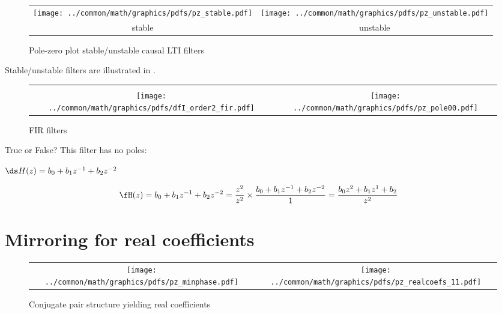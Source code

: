 \begin{figure}[ht]
  \centering%
  \begin{tabular}{|c|c|}
     \hline
     \texttt{[image: ../common/math/graphics/pdfs/pz\_stable.pdf]}
    &\texttt{[image: ../common/math/graphics/pdfs/pz\_unstable.pdf]}
    \\stable & unstable
    \\\hline
\end{tabular}
  \caption{
     Pole-zero plot stable/unstable causal LTI filters 
     \label{fig:pz_unstable}
     }
\end{figure}
\begin{example}
\label{ex:pz_unstable}
Stable/unstable filters are illustrated in .
\end{example}

\begin{figure}
  \centering
  \begin{tabular}{|c|c|}
      \hline
    \\\texttt{[image: ../common/math/graphics/pdfs/dfI\_order2\_fir.pdf]}
     &\texttt{[image: ../common/math/graphics/pdfs/pz\_pole00.pdf]}
    \\\hline
  \end{tabular}
  \caption{FIR filters \label{fig:fir}}
\end{figure}
True or False? This filter has no poles:

  $\ds H(z)= b_0 + b_1 z^{-1} + b_2 z^{-2}$


\begin{align*}
  \fH(z)
    &= b_0 + b_1 z^{-1} + b_2 z^{-2}
     = \frac{z^2}{z^2} \times \frac{b_0 + b_1 z^{-1} + b_2 z^{-2}}{1}
     = \frac{b_0 z^2 + b_1 z^{1} + b_2 }{z^2}
\end{align*}


\section{Mirroring for real coefficients}
\begin{figure}
  \centering
  \begin{tabular}{cc}
    \texttt{[image: ../common/math/graphics/pdfs/pz\_minphase.pdf]}
   &\texttt{[image: ../common/math/graphics/pdfs/pz\_realcoefs\_11.pdf]}
  \end{tabular}
\caption{Conjugate pair structure yielding real coefficients\label{fig:realcoefs}}
\end{figure}

